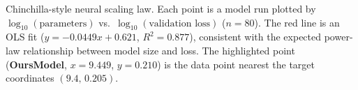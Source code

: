 \caption{Chinchilla-style neural scaling law. Each point is a model run plotted by
$\log_{10}(\text{parameters})$ vs.\ $\log_{10}(\text{validation loss})$ ($n{=}80$).
The red line is an OLS fit ($y = -0.0449x + 0.621$, $R^{2}=0.877$), consistent with
the expected power-law relationship between model size and loss.
The highlighted point (\textbf{OursModel}, $x=9.449$, $y=0.210$) is the data point
nearest the target coordinates $(9.4,\,0.205)$.}
